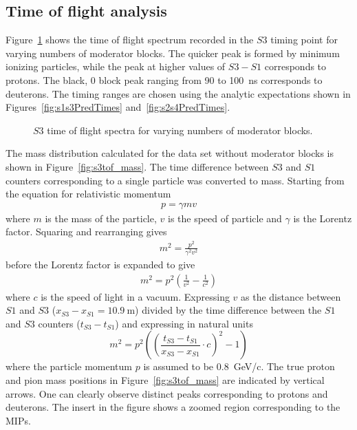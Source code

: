 \subsection{Time of flight analysis}

Figure~\ref{fig:s3tof} shows the time of flight spectrum recorded in the $\mathit{S3}$ timing point for varying numbers of moderator blocks.
The quicker peak is formed by minimum ionizing particles, while the peak at higher values of $\mathit{S3} - \mathit{S1}$ corresponds to protons.
The black, 0 block peak ranging from 90 to 100~ns corresponds to deuterons.
The timing ranges are chosen using the analytic expectations shown in Figures~\ref{fig:s1s3PredTimes} and~\ref{fig:s2s4PredTimes}.

\begin{figure}[h]
  \begin{adjustbox}{max totalsize={.8\textwidth}{.5\textheight},center}
    
  \end{adjustbox}
  \caption{$\mathit{S3}$ time of flight spectra for varying numbers of moderator blocks.}
  \label{fig:s3tof}
\end{figure}

The mass distribution calculated for the data set without moderator blocks is shown in Figure~\ref{fig:s3tof_mass}.
The time difference between $\mathit{S3}$ and $\mathit{S1}$ counters corresponding to a single particle was converted to mass.
Starting from the equation for relativistic momentum
\begin{align}
p = \gamma m v
\end{align}
where $m$ is the mass of the particle, $v$ is the speed of particle and $\gamma$ is the Lorentz factor.
Squaring and rearranging gives
\begin{align}
m^{2} = \frac{p^{2}}{\gamma^{2} v^{2}}
\end{align}
before the Lorentz factor is expanded to give
\begin{align}
m^{2} = p^{2}\left(\frac{1}{v^{2}} - \frac{1}{c^{2}}\right)
\end{align}
where $c$ is the speed of light in a vacuum. Expressing $v$ as the distance between $\mathit{S1}$ and $\mathit{S3}$ ($x_{\mathit{S3}}-x_{\mathit{S1}} = 10.9~\text{m}$) divided by the time difference between the $\mathit{S1}$ and $\mathit{S3}$ counters ($t_{\mathit{S3}} - t_{\mathit{S1}}$) and expressing in natural units 
\begin{equation} 
m^2 = p^2 \left( 
\left(\frac{t_{\mathit{S3}}-t_{\mathit{S1}}}{x_{\mathit{S3}}-x_{\mathit{S1}}} \cdot c \right)^2
- 1  \right)
\label{eq:recoMass}
\end{equation}
where the particle momentum $p$ is assumed to be 0.8~GeV/c.
The true proton and pion mass positions in Figure~\ref{fig:s3tof_mass} are indicated by vertical arrows.
One can clearly observe distinct peaks corresponding to protons and deuterons. 
The insert in the figure shows a zoomed region corresponding to the MIPs. 

